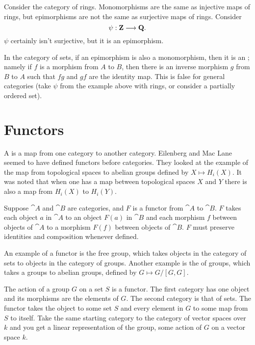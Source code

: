 \documentclass[11pt, oneside]{article}
\begin{document}
Consider the category of rings. Monomorphisms are the same as injective maps of rings, but epimorphisms are not the same as surjective maps of rings. Consider 
$$
\psi: \mathbf Z\longrightarrow \mathbf Q.
$$
$\psi$ certainly isn't surjective, but it is an epimorphism.

In the category of sets, if an epimorphism is also a monomorphism, then it is an ; namely if $f$ is a morphism from $A$ to $B$, then there is an inverse morphism $g$ from $B$ to $A$ such that $fg$ and $gf$ are the identity map. This is false for general categories (take $\psi$ from the example above with rings, or consider a partially ordered set).


\section{Functors}
A \href{https://en.wikipedia.org/wiki/Functor}{} is a map from one category to another category. Eilenberg and Mac Lane seemed to have defined functors before categories. They looked at the example of the map from topological spaces to abelian groups defined by $X\longmapsto H_i(X)$. It was noted that when one has a map between topological spaces $X$ and $Y$ there is also a map from $H_i(X)$ to $H_i(Y)$.

Suppose $\cat A$ and $\cat B$ are categories, and $F$ is a functor from $\cat A$ to $\cat B$. $F$ takes each object $a$ in $\cat A$ to an object $F(a)$ in $\cat B$ and each morphism $f$ between objects of $\cat A$ to a morphism $F(f)$ between objects of $\cat B$. $F$ must preserve identities and composition whenever defined.

An example of a functor is the free group, which takes objects in the category of sets to objects in the category of groups. Another example is the \href{https://en.wikipedia.org/wiki/Commutator_subgroup#Abelianization}{} of groups, which takes a groups to abelian groups, defined by $G\longmapsto G/ [G,G]$.

The action of a group $G$ on a set $S$ is a functor. The first category has one object and its morphisms are the elements of $G$. The second category is that of sets. The functor takes the object to some set $S$ and every element in $G$ to some map from $S$ to itself. Take the same starting category to the category of vector spaces over $k$ and you get a linear representation of the group, some action of $G$ on a vector space $k$. 
\end{document}
